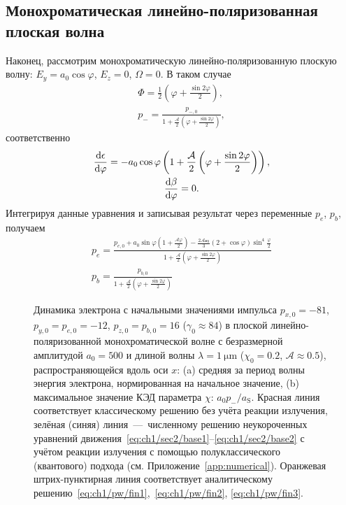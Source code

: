 \subsection{Монохроматическая линейно-поляризованная плоская волна}
\label{sub:ch1/sec6/LPW}
Наконец, рассмотрим монохроматическую линейно-поляризованную плоскую волну: $E_y=a_0\cos\varphi$, $E_z=0$, $\Omega=0$.
В таком случае
\begin{gather}
    \Phi = \frac{1}{2} \left( \varphi + \frac{\sin2\varphi}{2} \right), \\
    \label{eq:ch1/pw/fin1}
    p_- = \frac{p_{-, 0}}{1 + \frac{\mathcal{A}}{2} \left( \varphi + \frac{\sin2\varphi}{2} \right)},
\end{gather}
соответственно
\begin{gather}
    \dv{\epsilon}{\varphi} =  -a_0 \cos\varphi \left(1+\frac{\mathcal{A}}{2} \left( \varphi + \frac{\sin2\varphi}{2} \right)\right) , \\
    \dv{\beta}{\varphi} = 0.
\end{gather}
Интегрируя данные уравнения и записывая результат через переменные $p_e$, $p_b$, получаем
\begin{gather}
    \label{eq:ch1/pw/fin2}
    p_e = \frac{p_{e,0}+a_0\sin\varphi\left(1 + \frac{\mathcal{A}\varphi}{2}\right) - \frac{2 \mathcal{Aa_0}}{3} (2 + \cos\varphi)\sin^4\frac{\varphi}{2}}{1+\frac{\mathcal{A}}{2} \left( \varphi + \frac{\sin2\varphi}{2} \right)} \\
    \label{eq:ch1/pw/fin3}
    p_b = \frac{p_{b, 0}}{1+\frac{\mathcal{A}}{2} \left( \varphi + \frac{\sin2\varphi}{2} \right)}
\end{gather}

\begin{figure}[ht]
    \caption[Динамика электрона в линейно-поляризованной монохроматической плоской волне]{
    Динамика электрона с начальными значениями импульса $p_{x, 0} = -81$, $p_{y, 0} = p_{e, 0} = -12$, $p_{z, 0} = p_{b,0} = 16$ ($\gamma_0 \approx 84$) в плоской линейно-поляризованной монохроматической волне с безразмерной амплитудой $a_0 = 500$ и длиной волны $\lambda = \SI{1}{\um}$ ($\chi_0 = 0.2$, $\mathcal{A}\approx 0.5$), распространяющейся вдоль оси $x$: (a) средняя за период волны энергия электрона, нормированная на начальное значение, (b) максимальное значение КЭД параметра $\chi$: $a_0 p_-/a_\mathrm{S}$. Красная линия соответствует классическому решению без учёта реакции излучения, зелёная (синяя) линия~---~численному решению неукороченных уравнений движения~\eqref{eq:ch1/sec2/base1}--\eqref{eq:ch1/sec2/base2} с учётом реакции излучения с помощью полуклассического (квантового) подхода (см. Приложение~\ref{app:numerical}). Оранжевая штрих-пунктирная линия соответствует аналитическому решению~\eqref{eq:ch1/pw/fin1},~\eqref{eq:ch1/pw/fin2}, \eqref{eq:ch1/pw/fin3}. 
    }
    \label{fig:ch1/sec5/lpw}
\end{figure}

